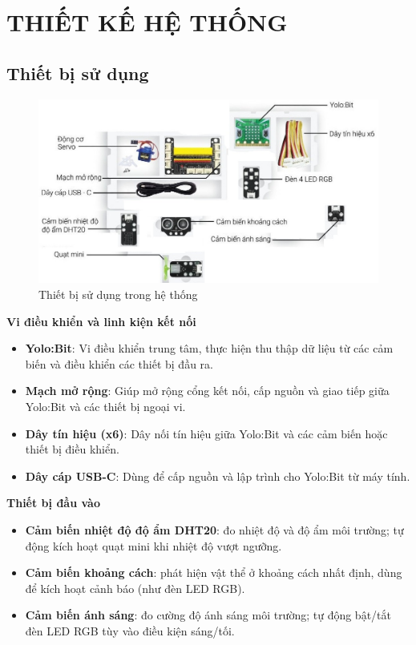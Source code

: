 \newpage
\section{THIẾT KẾ HỆ THỐNG}

\subsection{Thiết bị sử dụng}

\begin{figure}[H]
    \centering
    \includegraphics[width=\textwidth]{figures/selected_device.jpg}
    \caption{Thiết bị sử dụng trong hệ thống}
    \label{fig:selected_device}
\end{figure}

\textbf{Vi điều khiển và linh kiện kết nối}
\begin{itemize}
    \item \textbf{Yolo:Bit}: Vi điều khiển trung tâm, thực hiện thu thập dữ liệu từ các cảm biến và điều khiển các thiết bị đầu ra.
    \item \textbf{Mạch mở rộng}: Giúp mở rộng cổng kết nối, cấp nguồn và giao tiếp giữa Yolo:Bit và các thiết bị ngoại vi.
    \item \textbf{Dây tín hiệu (x6)}: Dây nối tín hiệu giữa Yolo:Bit và các cảm biến hoặc thiết bị điều khiển.
    \item \textbf{Dây cáp USB-C}: Dùng để cấp nguồn và lập trình cho Yolo:Bit từ máy tính.
\end{itemize}

\textbf{Thiết bị đầu vào}
\begin{itemize}
    \item \textbf{Cảm biến nhiệt độ độ ẩm DHT20}: đo nhiệt độ và độ ẩm môi trường; tự động kích hoạt quạt mini khi nhiệt độ vượt ngưỡng.
    \item \textbf{Cảm biến khoảng cách}: phát hiện vật thể ở khoảng cách nhất định, dùng để kích hoạt cảnh báo (như đèn LED RGB).
    \item \textbf{Cảm biến ánh sáng}: đo cường độ ánh sáng môi trường; tự động bật/tắt đèn LED RGB tùy vào điều kiện sáng/tối.
\end{itemize}


